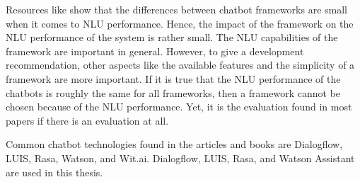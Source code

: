 Resources like \citet{braunEvaluatingNLU} show that the differences between chatbot frameworks are small when it comes to NLU performance.
Hence, the impact of the framework on the NLU performance of the system is rather small.
The NLU capabilities of the framework are important in general. 
However, to give a development recommendation, other aspects like the available features and the simplicity of a framework are more important.
If it is true that the NLU performance of the chatbots is roughly the same for all frameworks, then a framework cannot be chosen because of the NLU performance.
Yet, it is the evaluation found in most papers if there is an evaluation at all. 

Common chatbot technologies found in the articles and books are Dialogflow, LUIS,  Rasa, Watson, and Wit.ai.
Dialogflow, LUIS, Rasa, and Watson Assistant are used in this thesis.
